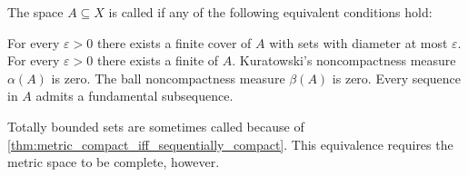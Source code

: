 \begin{definition}\label{def:totally_bounded_set}
  The space \( A \subseteq X \) is called  if any of the following equivalent conditions hold:

  \begin{defenum}
     For every \( \varepsilon > 0 \) there exists a finite cover of \( A \) with sets with diameter at most \( \varepsilon \).
     For every \( \varepsilon > 0 \) there exists a finite  of \( A \).
     Kuratowski's noncompactness measure \( \alpha(A) \) is zero.
     The ball noncompactness measure \( \beta(A) \) is zero.
     Every sequence in \( A \) admits a fundamental subsequence.
  \end{defenum}

  Totally bounded sets are sometimes called  because of \cref{thm:metric_compact_iff_sequentially_compact}. This equivalence requires the metric space to be complete, however.
\end{definition}
